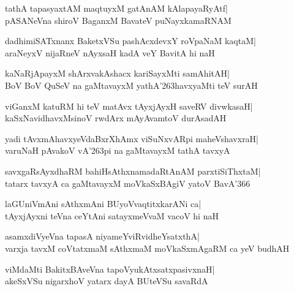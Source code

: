 \documentclass[twoside,12pt,openright]{book}
\def\S{\char'263}
\newcounter{shloka}[chapter]
\begin{document}
\begin{shloka}%
tathA tapasyaxtAM maqtuyxM gatAnAM kAlapayaRyAtf|\\
pASANeVna shiroV BaganxM BavateV puNayxkamaRNAM
\end{shloka}

\begin{shloka}%
dadhimiSATxnanx BaketxVSu pashAcxdevxY roVpaNaM kaqtaM|\\
araNeyxV nijaRneV nAyxsaH kadA veY BavitA hi naH
\end{shloka}

\begin{shloka}%
kaNaRjApayxM shArxvakAshacx kariSayxMti samAhitAH|\\
BoV BoV QuSeV na gaMtavayxM yathA\S havxyaMti teV surAH
\end{shloka}

\begin{shloka}%
viGanxM katuRM hi teV matAvx tAyxjAyxH saveRV divwkasaH|\\
kaSxNavidhavxMsinoV rwdArx mAyAvamtoV durAsadAH
\end{shloka}

\begin{shloka}%
yadi tAvxmAhavxyeVdaBxrXhAmx viSuNxvARpi maheVshavxraH|\\
varuNaH pAvakoV vA\S pi na gaMtavayxM tathA tavxyA
\end{shloka}

\begin{shloka}%
savxgaRsAyxdhaRM bahiHsAthxnamadaRtAnAM parxtiSiThxtaM|\\
tatarx tavxyA ca gaMtavayxM moVkaSxBAgiV yatoV BavA\char'366
\end{shloka}

\begin{shloka}%
laGUniVmAni sAthxmAni BUyoVvaqtitxkarANi ca|\\
tAyxjAyxni teVna ceYtAni satayxmeVvaM vacoV hi naH
\end{shloka}

\begin{shloka}%
asamxdiVyeVna tapasA niyameYviRvidheYsatxthA|\\
varxja tavxM coVtatxmaM sAthxmaM moVkaSxmAgaRM ca yeV budhAH
\end{shloka}

\begin{shloka}%
viMdaMti BakitxBAveVna tapoVyukAtxsatxpasivxnaH|\\
akeSxVSu nigarxhoV yatarx dayA BUteVSu savaRdA
\end{shloka}
\end{document}
